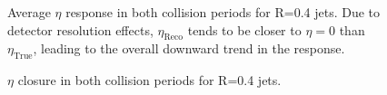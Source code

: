 \documentclass[NOTE, atlasdraft=true, texlive=2016, USenglish]{\ATLASLATEXPATH atlasdoc}
\begin{document}
\begin{figure}[htbp]
	\centering
	\caption{Average $\eta$ response in both collision periods for R=0.4 jets. Due to detector resolution effects, $\eta_{\text{Reco}}$ tends to be closer to $\eta = 0$ than $\eta_{\text{True}}$, leading to the overall downward trend in the response.}
	\label{fig:EtaResponse}
\end{figure}

\begin{figure}[htbp]
	\centering
	\caption{$\eta$ closure in both collision periods for R=0.4 jets.}
	\label{fig:EtaClosure}
\end{figure}

\end{document}

